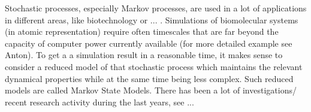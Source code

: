 \label{chap:markov}






Stochastic processes, especially Markov processes, are used in a lot of applications in different areas, like biotechnology or ... . Simulations of biomolecular systems (in atomic representation) require often timescales that are far beyond the capacity of computer power currently available (for more detailed example see Anton).
To get a a simulation result in a reasonable time, it makes sense to consider a reduced model of that stochastic process which maintains the relevant dynamical properties while at the same time being less complex. Such reduced models are called Markov State Models. There has been a lot of investigations/ recent research activity during the last years, see ...

